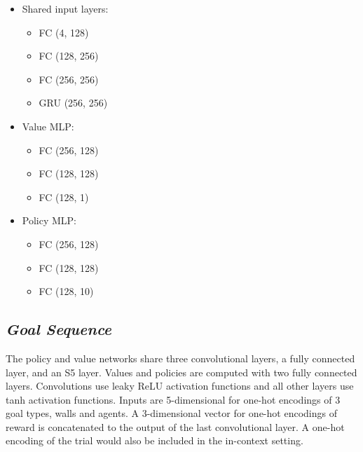 \documentclass{article}
\begin{document}
\begin{itemize}
\item{Shared input layers:}
\begin{itemize}
\item{FC (4, 128)}
\item{FC (128, 256)}
\item{FC (256, 256)}
\item{GRU (256, 256)}
\end{itemize}
\item{Value MLP:}
\begin{itemize}
\item{FC (256, 128)}
\item{FC (128, 128)}
\item{FC (128, 1)}
\end{itemize}
\item{Policy MLP:}
\begin{itemize}
\item{FC (256, 128)}
\item{FC (128, 128)}
\item{FC (128, 10)}
\end{itemize}
\end{itemize}

\subsection{\textit{Goal Sequence}}

The policy and value networks share three convolutional layers, a fully connected layer, and an S5 layer. Values and policies are computed with two fully connected layers. Convolutions use leaky ReLU activation functions and all other layers use tanh activation functions. Inputs are 5-dimensional for one-hot encodings of 3 goal types, walls and agents. A 3-dimensional vector for one-hot encodings of reward is concatenated to the output of the last convolutional layer. A one-hot encoding of the trial would also be included in the in-context setting.
\end{document}
